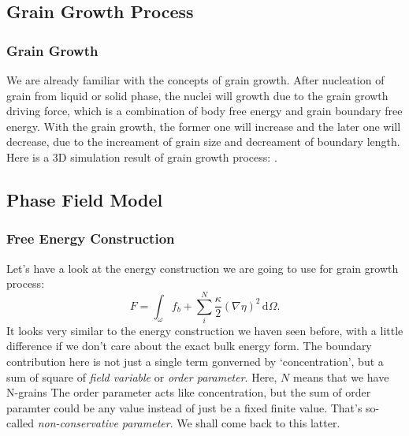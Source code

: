 \documentclass[compress,xcolor={dvipsnames}]{beamer}
\newcommand{\bhref}[2]{
    \href{#1}{\color{blue}{#2}}
}
\begin{document}
\subsection{Grain Growth Process}
\begin{frame}
    \frametitle{Grain Growth}

    We are already familiar with the concepts of grain growth. After nucleation of grain from liquid or solid phase, the nuclei will growth due to the grain growth driving force, which is a combination of body free energy and grain boundary free energy. With the grain growth, the former one will increase and the later one will decrease, due to the increament of grain size and decreament of boundary length. Here is a 3D simulation result of grain growth process: \bhref{pic/Grgr3d_small.gif}{3D Grain Growth}.

\end{frame}

\subsection{Phase Field Model}
\begin{frame}
    \frametitle{Free Energy Construction}

    Let's have a look at the energy construction we are going to use for grain growth process:
    \[
        F = \int_\omega f_b + \sum_{i}^{N}\frac{\kappa}{2} \left( \nabla \eta \right)^2 \,\mathrm{d}\Omega.
    \]
    It looks very similar to the energy construction we haven seen before, with a little difference if we don't care about the exact bulk energy form. The boundary contribution here is not just a single term gonverned by `concentration', but a sum of square of \emph{field variable} or \emph{order parameter}. Here, \(N\) means that we have N-grains The order parameter acts like concentration, but the sum of order paramter could be any value instead of just be a fixed finite value. That's so-called \emph{non-conservative parameter}. We shall come back to this latter.

\end{frame}
\end{document}
